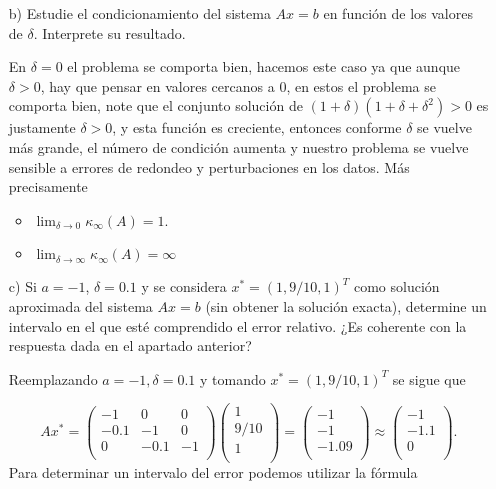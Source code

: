 \begin{enumerate}
\begin{solution}
    \end{solution}
    \item[b)] Estudie el condicionamiento del sistema $Ax = b$ en función de los valores de $\delta$. Interprete su resultado.

    \begin{solution}
        En $\delta=0$ el problema se comporta bien, hacemos este  caso ya que aunque $\delta>0$, hay que pensar en valores cercanos a $0$, en estos el problema se comporta bien, note que el conjunto solución de $(1+\delta)(1+\delta+\delta^2)>0$ es justamente $\delta>0$, y esta función es creciente, entonces conforme $\delta$ se vuelve más grande, el número de condición aumenta y nuestro problema se vuelve sensible a errores de redondeo y perturbaciones en los datos. Más precisamente

        \begin{itemize}
            \item $\lim_{\delta\to 0} \kappa_{\infty}(A)=1$.\\
            \item $\lim_{\delta  \to \infty} \kappa_\infty(A)=\infty$ 
        \end{itemize}
    \end{solution}
    \item[c)] Si $a = -1$, $\delta = 0.1$ y se considera $x^* = (1, 9/10, 1)^T$ como solución aproximada del sistema $Ax = b$ (sin obtener la solución exacta), determine un intervalo en el que esté comprendido el error relativo. ¿Es coherente con la respuesta dada en el apartado anterior?

    \begin{solution}
        Reemplazando $a=-1, \delta=0.1$ y tomando $x^* = (1, 9/10, 1)^T$ se sigue que

        $$Ax^*=\left(
\begin{array}{ccc}
 -1 & 0 & 0 \\
 -0.1 & -1 & 0 \\
 0 & -0.1 & -1 \\
\end{array}
\right)\left(
\begin{array}{c}
 1 \\
 9/10 \\
 1 \\
\end{array}
\right)=\left(
\begin{array}{c}
 -1 \\
 -1 \\
 -1.09 \\
\end{array}
\right)\approx \left(
\begin{array}{c}
 -1 \\
 -1.1 \\
 0 \\
\end{array}
\right).$$
Para determinar un intervalo del error podemos utilizar la fórmula


\end{solution}
\end{enumerate}
